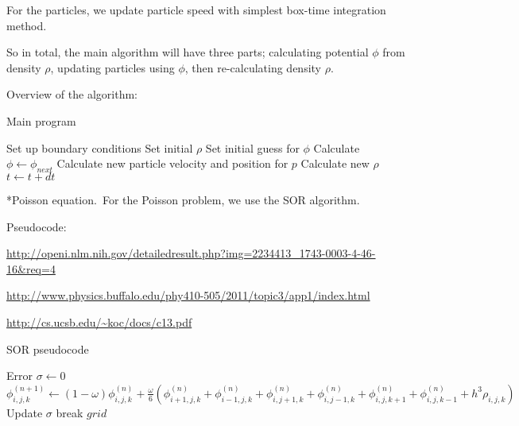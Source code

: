 \documentclass[titlepage, 11pt]{article}
\makeatletter
\renewcommand{\subsubsection}{\@startsection
        {subsubsection}
        {2}
        {0mm}
        {.5\baselineskip}
        {0mm}
        {\it\bfseries\normalsize}}
\makeatother
\begin{document}
For the particles, we update particle speed with simplest box-time integration method.

So in total, the main algorithm will have three parts; calculating potential $\phi$ 
from density $\rho$, updating particles using $\phi$, then re-calculating density 
$\rho$.

Overview of the algorithm:

\begin{algorithm}
 \label{alg:main}
 \caption{Main program}
 \begin{algorithmic}
  \State Set up boundary conditions
  \State Set initial $\rho$
  \State Set initial guess for $\phi$
  \Loop
   \State Calculate $\phi \gets \phi_{next}$
    \State Calculate new particle velocity and position for $p$
   \EndFor
   \State Calculate new $\rho$
   \State $t \gets t+dt$
  \EndLoop
 \end{algorithmic}

\end{algorithm}


\subsubsection*{Poisson equation.}\ For the Poisson problem, we use the SOR algorithm.

Pseudocode: 

\url{http://openi.nlm.nih.gov/detailedresult.php?img=2234413_1743-0003-4-46-16&req=4}

\url{http://www.physics.buffalo.edu/phy410-505/2011/topic3/app1/index.html}

\url{http://cs.ucsb.edu/~koc/docs/c13.pdf}

\begin{algorithm}
 \label{pseudo:SOR}
 \caption{SOR pseudocode}
\begin{algorithmic}[1]
   \State Error $\sigma \gets 0$
    \State $\phi_{i,j,k}^{(n+1)} \gets (1-\omega)\phi_{i,j,k}^{(n)} + \frac{\omega}{6} (\phi_{i+1,j,k}^{(n)} + \phi_{i-1,j,k}^{(n)} + \phi_{i,j+1,k}^{(n)} + \phi_{i,j-1,k}^{(n)} + \phi_{i,j,k+1}^{(n)} + \phi_{i,j,k-1}^{(n)} + h^3\rho_{i,j,k})$
    \State Update $\sigma$
   \EndFor
    break
   \EndIf
  \EndFor
  \State \Return $grid$
 \EndFunction
\end{algorithmic}
\end{algorithm}
\end{document}
